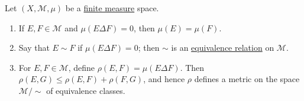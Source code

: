 	\begin{exercise}[Folland 1.12]
		Let $(X, \mathcal{M}, \mu)$ be a \hyperref[def:finite-measure]{finite measure} space.
		\begin{enumerate}[label=\textbf{\alph*.}]
			\item If $E, F \in \mathcal{M}$ and $\mu(E \Delta F) = 0$, then $\mu(E) = \mu(F)$.
			\item Say that $E \sim F$ if $\mu(E \Delta F) = 0$; then $\sim$ is an \hyperref[st-def:equivalence_relation]{equivalence relation} on $\mathcal{M}$.
			\item For $E, F \in \mathcal{M}$, define $\rho(E, F) = \mu(E \Delta F)$. Then $\rho(E, G) \le \rho(E, F) + \rho(F, G)$, and hence $\rho$ defines a metric on the space $\mathcal{M}/{\sim}$ of equivalence classes.
		\end{enumerate}
	\end{exercise}
